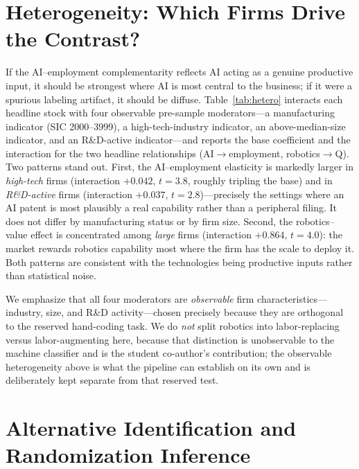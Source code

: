 \documentclass[12pt]{article}
\begin{document}
\section{Heterogeneity: Which Firms Drive the Contrast?}\label{sec:het}
If the AI--employment complementarity reflects AI acting as a genuine productive input, it should
be strongest where AI is most central to the business; if it were a spurious labeling artifact, it
should be diffuse. Table~\ref{tab:hetero} interacts each headline stock with four observable
pre-sample moderators---a manufacturing indicator (SIC 2000--3999), a high-tech-industry
indicator, an above-median-size indicator, and an R\&D-active indicator---and reports the base
coefficient and the interaction for the two headline relationships (AI$\to$employment,
robotics$\to$Q). Two patterns stand out. First, the AI--employment elasticity is markedly larger
in \emph{high-tech} firms (interaction $+0.042$, $t=3.8$, roughly tripling the base) and in
\emph{R\&D-active} firms (interaction $+0.037$, $t=2.8$)---precisely the settings where an AI
patent is most plausibly a real capability rather than a peripheral filing. It does not differ by
manufacturing status or by firm size. Second, the robotics--value effect is concentrated among
\emph{large} firms (interaction $+0.864$, $t=4.0$): the market rewards robotics capability most
where the firm has the scale to deploy it. Both patterns are consistent with the technologies
being productive inputs rather than statistical noise.

We emphasize that all four moderators are \emph{observable} firm characteristics---industry, size,
and R\&D activity---chosen precisely because they are orthogonal to the reserved hand-coding task.
We do \emph{not} split robotics into labor-replacing versus labor-augmenting here, because that
distinction is unobservable to the machine classifier and is the student co-author's
contribution; the observable heterogeneity above is what the pipeline can establish on its own and
is deliberately kept separate from that reserved test.

\section{Alternative Identification and Randomization Inference}\label{sec:robust}
\end{document}
